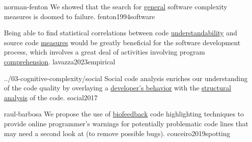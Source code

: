 \documentclass{article}
\begin{document}

\qte
  {norman-fenton}
  {We showed that the search for \ul{general} software complexity measures is doomed to failure.}
  {fenton1994software}

  {Being able to find statistical correlations between code \ul{understandability} and source code \ul{measures} would be greatly beneficial for the software development process, which involves a great deal of activities involving program \ul{comprehension}.}
  {lavazza2023empirical}


\qte
  {../03-cognitive-complexity/social}
  {Social code analysis enriches our understanding of the code quality by overlaying a \ul{developer's behavior} with the \ul{structural analysis} of the code.}
  {social2017}


\qte
  {raul-barbosa}
  {We propose the use of \ul{biofeedback} code highlighting techniques to provide online programmer's warnings for potentially problematic code lines that may need a second look at (to remove possible bugs).}
  {couceiro2019spotting}
\end{document}
